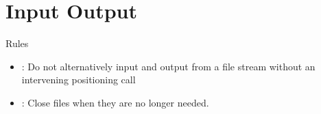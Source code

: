 \section{Input Output}

\begin{frame}[t]{Rules}
\begin{itemize}
  \item {}: 
        Do not alternatively input and output from a file stream
        without an intervening positioning call
  \item {}: 
        Close files when they are no longer needed.
\end{itemize}
\end{frame}


